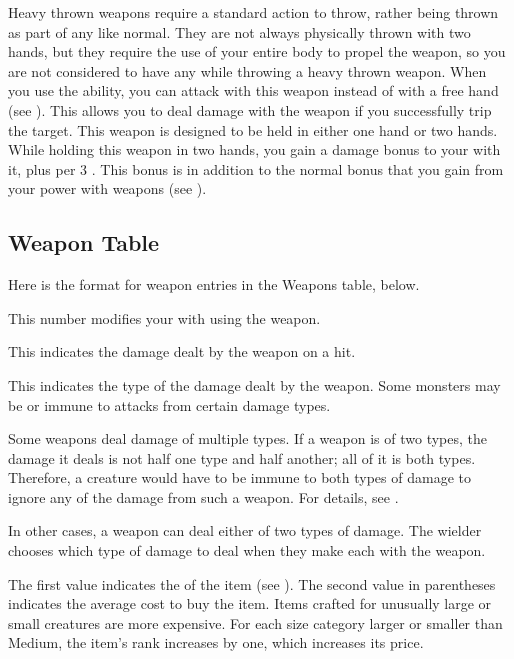         Heavy thrown weapons require a standard action to throw, rather being thrown as part of any  like normal.
        They are not always physically thrown with two hands, but they require the use of your entire body to propel the weapon, so you are not considered to have any  while throwing a heavy thrown weapon.
         When you use the  ability, you can attack with this weapon instead of with a free hand (see ).
        This allows you to deal damage with the weapon if you successfully trip the target.
         This weapon is designed to be held in either one hand or two hands.
        While holding this weapon in two hands, you gain a  damage bonus to your  with it, plus  per 3 .
        This bonus is in addition to the normal bonus that you gain from your power with weapons (see ).

    \subsection{Weapon Table}
        Here is the format for weapon entries in the Weapons table, below.

         This number modifies your  with  using the weapon.

         This  indicates the damage dealt by the weapon on a hit.

         This indicates the type of the damage dealt by the weapon.
        Some monsters may be  or immune to attacks from certain damage types.

        Some weapons deal damage of multiple types. If a weapon is of two types, the damage it deals is not half one type and half another; all of it is both types.
        Therefore, a creature would have to be immune to both types of damage to ignore any of the damage from such a weapon.
        For details, see .

        In other cases, a weapon can deal either of two types of damage.
        The wielder chooses which type of damage to deal when they make each  with the weapon.

         The first value indicates the  of the item (see ).
        The second value in parentheses indicates the average cost to buy the item.
        Items crafted for unusually large or small creatures are more expensive.
        For each size category larger or smaller than Medium, the item's rank increases by one, which increases its price.

